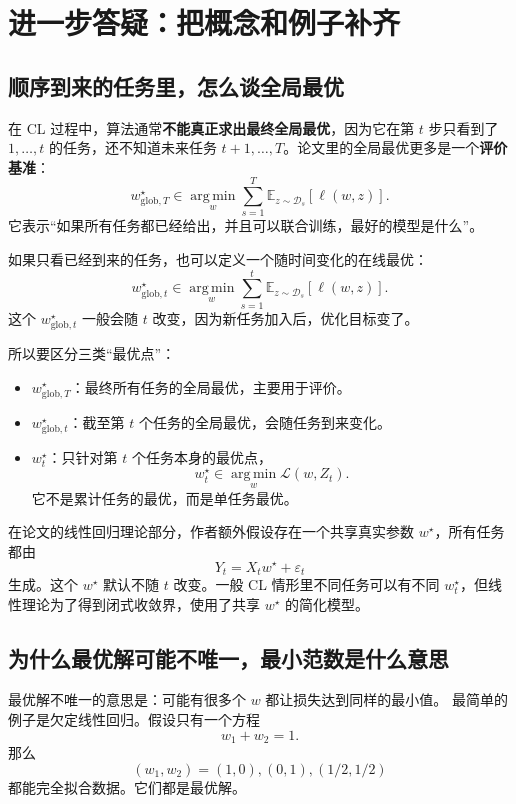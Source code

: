 \documentclass[UTF8,fontset=none,11pt]{ctexart}
\theoremstyle{cnstyle}
\newcommand{\E}{\mathbb{E}}
\newcommand{\argmin}{\operatorname*{arg\,min}}
\newcommand{\calL}{\mathcal{L}}
\newcommand{\calD}{\mathcal{D}}
\begin{document}
\section{进一步答疑：把概念和例子补齐}

\subsection{顺序到来的任务里，怎么谈全局最优}

在 CL 过程中，算法通常\textbf{不能真正求出最终全局最优}，因为它在第 \(t\) 步只看到了 \(1,\dots,t\) 的任务，还不知道未来任务 \(t+1,\dots,T\)。论文里的全局最优更多是一个\textbf{评价基准}：
\[
  w_{\mathrm{glob},T}^\star
  \in
  \argmin_w
  \sum_{s=1}^T\E_{z\sim\calD_s}[\ell(w,z)].
\]
它表示“如果所有任务都已经给出，并且可以联合训练，最好的模型是什么”。

如果只看已经到来的任务，也可以定义一个随时间变化的在线最优：
\[
  w_{\mathrm{glob},t}^\star
  \in
  \argmin_w
  \sum_{s=1}^t\E_{z\sim\calD_s}[\ell(w,z)].
\]
这个 \(w_{\mathrm{glob},t}^\star\) 一般会随 \(t\) 改变，因为新任务加入后，优化目标变了。

所以要区分三类“最优点”：
\begin{itemize}
  \item \(w_{\mathrm{glob},T}^\star\)：最终所有任务的全局最优，主要用于评价。
  \item \(w_{\mathrm{glob},t}^\star\)：截至第 \(t\) 个任务的全局最优，会随任务到来变化。
  \item \(w_t^\star\)：只针对第 \(t\) 个任务本身的最优点，
  \[
    w_t^\star\in\argmin_w\calL(w,Z_t).
  \]
  它不是累计任务的最优，而是单任务最优。
\end{itemize}

在论文的线性回归理论部分，作者额外假设存在一个共享真实参数 \(w^\star\)，所有任务都由
\[
  Y_t=X_tw^\star+\varepsilon_t
\]
生成。这个 \(w^\star\) 默认不随 \(t\) 改变。一般 CL 情形里不同任务可以有不同 \(w_t^\star\)，但线性理论为了得到闭式收敛界，使用了共享 \(w^\star\) 的简化模型。

\subsection{为什么最优解可能不唯一，最小范数是什么意思}

最优解不唯一的意思是：可能有很多个 \(w\) 都让损失达到同样的最小值。
最简单的例子是欠定线性回归。假设只有一个方程
\[
  w_1+w_2=1.
\]
那么
\[
  (w_1,w_2)=(1,0),(0,1),(1/2,1/2)
\]
都能完全拟合数据。它们都是最优解。
\end{document}
